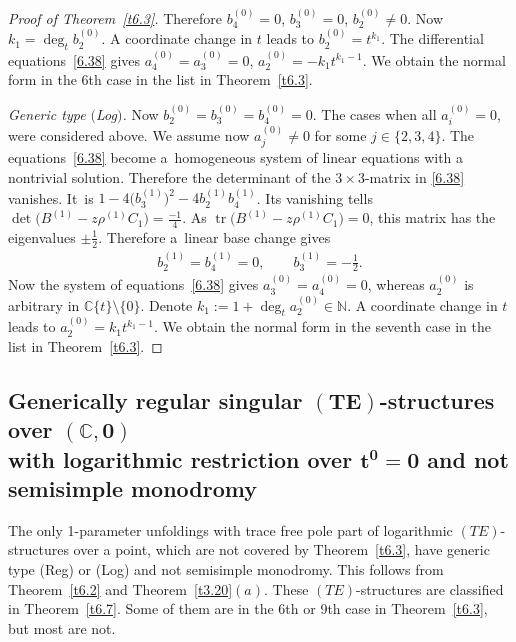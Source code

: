 \documentclass[pdftex]{sigma}%
\numberwithin{equation}{section}
\numberwithin{figure}{section}
\newcommand{\N}{{\mathbb N}}
\newcommand{\C}{{\mathbb C}}
\DeclareMathOperator{\tr}{tr}
\begin{document}
\begin{proof}[Proof of Theorem~\ref{t6.3}]
Therefore $b_4^{(0)}=0$, $b_3^{(0)}=0$, $b_2^{(0)}\neq 0$.
Now $k_1=\deg_t b_2^{(0)}$.
A coordinate change in $t$ leads to
$b_2^{(0)}=t^{k_1}$. The differential equations~\eqref{6.38} gives
$a_4^{(0)}=a_3^{(0)}=0$, $a_2^{(0)}=-k_1t^{k_1-1}$.
We obtain the normal form in the 6th case in the list
in Theorem~\ref{t6.3}.

\medskip\noindent
{\it Generic type $($Log$)$.}
Now $b_2^{(0)}=b_3^{(0)}=b_4^{(0)}=0$.
The cases when all $a_i^{(0)}=0$, were consi\-de\-red above.
We assume now $a_j^{(0)}\neq 0$ for some $j\in\{2,3,4\}$.
The equations~\eqref{6.38} become a~homogeneous system
of linear equations with a nontrivial solution.
Therefore the determinant of the $3\times 3$-matrix in
\eqref{6.38} vanishes. It~is $1-4\big(b_3^{(1)}\big)^2-4b_2^{(1)}b_4^{(1)}$.
Its vanishing tells $\det \big(B^{(1)}-z\rho^{(1)}C_1\big)=\frac{-1}{4}$.
As $\tr\big(B^{(1)}-z\rho^{(1)}C_1\big)=0$, this matrix has the
eigenvalues $\pm\frac{1}{2}$.
Therefore a~linear base change gives
\begin{gather*}
b_2^{(1)}=b_4^{(1)}=0,\qquad b_3^{(1)}=-\frac{1}{2}.
\end{gather*}
Now the system of equations~\eqref{6.38} gives
$a_3^{(0)}=a_4^{(0)}=0$, whereas $a_2^{(0)}$ is
arbitrary in $\C\{t\}\setminus\{0\}$.
Denote $k_1:=1+\deg_t a_2^{(0)}\in\N$. A coordinate change
in $t$ leads to $a_2^{(0)}=k_1t^{k_1-1}$.
We obtain the normal form in the seventh case in the list
in Theorem~\ref{t6.3}.
\end{proof}

\subsection[Generically regular singular $(TE)$-structures
over $(\C,0)$ with logarithmic restriction over $t^0=0$
and not semisimple monodromy]
{Generically regular singular $\boldsymbol{(TE)}$-structures
over $\boldsymbol{(\C,0)}$ \\with logarithmic restriction over $\boldsymbol{t^0=0}$
and not semisimple monodromy}\label{c6.3}

The only 1-parameter unfoldings with trace free pole part
of logarithmic $(TE)$-structures over a point,
which are not covered by Theorem~\ref{t6.3}, have
generic type (Reg) or (Log) and not semisimple monodromy.
This follows from Theorem~\ref{t6.2}
and Theorem~\ref{t3.20}$(a)$.
These $(TE)$-structures are classified in Theorem~\ref{t6.7}. Some of them are in the 6th or 9th case
in Theorem~\ref{t6.3}, but most are not.
\end{document}
